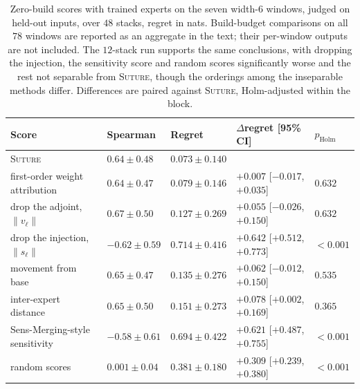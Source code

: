 \documentclass{article}
\theoremstyle{plain}
\theoremstyle{definition}
\theoremstyle{remark}
\begin{document}
\begin{table}[H]
\centering
\footnotesize
\setlength{\tabcolsep}{3pt}
\caption{Zero-build scores with trained experts on the seven width-6 windows,
judged on held-out inputs, over $48$ stacks, regret in nats. Build-budget
comparisons on all $78$ windows are reported as an aggregate in the text; their
per-window outputs are not included. The $12$-stack run supports the same conclusions, with
dropping the injection, the sensitivity score and random scores significantly
worse and the rest not separable from \textsc{Suture}, though the orderings among
the inseparable methods differ.
Differences are paired against \textsc{Suture}, Holm-adjusted within the block.}
\label{tab:trained}
\begin{tabular}{@{}>{\raggedright\arraybackslash}p{}>{\centering\arraybackslash}p{}>{\centering\arraybackslash}p{}>{\centering\arraybackslash}p{}>{\centering\arraybackslash}p{}@{}}
\toprule
\textbf{Score} & \textbf{Spearman} & \textbf{Regret} & \textbf{$\Delta$regret [95\% CI]} & \textbf{$p_{\text{Holm}}$} \\
\midrule
\textsc{Suture} & $0.64\pm0.48$ & $0.073\pm0.140$ & &  \\
first-order weight attribution & $0.64\pm0.47$ & $0.079\pm0.146$ & $+0.007$ [$-0.017$, $+0.035$] & $0.632$ \\
drop the adjoint, $\|v_\ell\|$ & $0.67\pm0.50$ & $0.127\pm0.269$ & $+0.055$ [$-0.026$, $+0.150$] & $0.632$ \\
drop the injection, $\|s_\ell\|$ & $-0.62\pm0.59$ & $0.714\pm0.416$ & $+0.642$ [$+0.512$, $+0.773$] & $<0.001$ \\
movement from base & $0.65\pm0.47$ & $0.135\pm0.276$ & $+0.062$ [$-0.012$, $+0.150$] & $0.535$ \\
inter-expert distance & $0.65\pm0.50$ & $0.151\pm0.273$ & $+0.078$ [$+0.002$, $+0.169$] & $0.365$ \\
Sens-Merging-style sensitivity & $-0.58\pm0.61$ & $0.694\pm0.422$ & $+0.621$ [$+0.487$, $+0.755$] & $<0.001$ \\
random scores & $0.001\pm0.04$ & $0.381\pm0.180$ & $+0.309$ [$+0.239$, $+0.380$] & $<0.001$ \\
\midrule
\bottomrule
\end{tabular}
\end{table}
\end{document}

